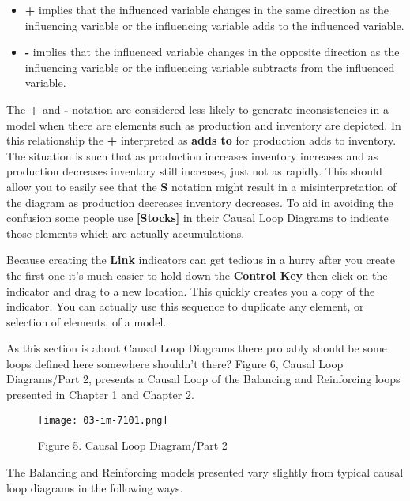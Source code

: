 \documentclass[]{memoir}
\let\Oldincludegraphics\includegraphics
\renewcommand{\includegraphics}[1]{\Oldincludegraphics[max size={\textwidth}{\textheight}]{#1}}
\newcommand{\p}[1]{\textbf{{[}#1{]}}}
\renewcommand{\u}[1]{\textbf{#1}}
\begin{document}
\begin{itemize}
\itemsep1pt\parskip0pt
\item
  \textbf{+} implies that the influenced variable changes in the same
  direction as the influencing variable or the influencing variable adds
  to the influenced variable.
\item
  \textbf{-} implies that the influenced variable changes in the
  opposite direction as the influencing variable or the influencing
  variable subtracts from the influenced variable.
\end{itemize}

The \textbf{+} and \textbf{-} notation are considered less likely to
generate inconsistencies in a model when there are elements such as
production and inventory are depicted. In this relationship the
\textbf{+} interpreted as \textbf{adds to} for production adds to
inventory. The situation is such that as production increases inventory
increases and as production decreases inventory still increases, just
not as rapidly. This should allow you to easily see that the \textbf{S}
notation might result in a misinterpretation of the diagram as
production decreases inventory decreases. To aid in avoiding the
confusion some people use \p{Stocks} in their Causal Loop Diagrams to
indicate those elements which are actually accumulations.

Because creating the \u{Link} indicators can get tedious in a hurry
after you create the first one it's much easier to hold down the
\u{Control Key} then click on the indicator and drag to a new location.
This quickly creates you a copy of the indicator. You can actually use
this sequence to duplicate any element, or selection of elements, of a
model.

As this section is about Causal Loop Diagrams there probably should be
some loops defined here somewhere shouldn't there? Figure 6, Causal Loop
Diagrams/Part 2, presents a Causal Loop of the Balancing and Reinforcing
loops presented in Chapter 1 and Chapter 2.

\begin{figure}[htbp]
\centering
\texttt{[image: 03-im-7101.png]}
\caption{Figure 5. Causal Loop Diagram/Part 2}
\end{figure}

The Balancing and Reinforcing models presented vary slightly from
typical causal loop diagrams in the following ways.
\end{document}
